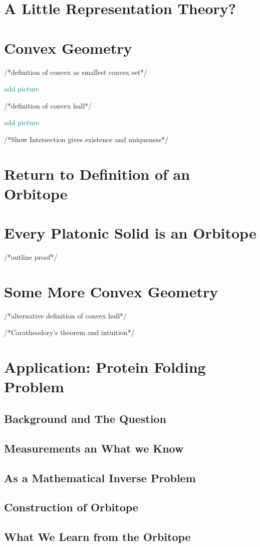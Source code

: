 \documentclass[12]{amsart}
\newcommand{\toadd}[1]{/*#1*/}
\newcommand{\note}[1]{\textcolor{teal}{#1}}
\begin{document}
\section{A Little Representation Theory?}

\section{Convex Geometry}
\toadd{definition of convex as smallest convex set}

\note{add picture}

\toadd{definition of convex hull}

\note{add picture}

\toadd{Show Intersection gives existence and uniqueness}

\section{Return to Definition of an Orbitope}

\section{Every Platonic Solid is an Orbitope}
\toadd{outline proof}

\section{Some More Convex Geometry}
\toadd{alternative definition of convex hull}

\toadd{Caratheodory's theorem and intuition}

\section{Application: Protein Folding Problem}
\subsection{Background and The Question}

\subsection{Measurements an What we Know}

\subsection{As a Mathematical Inverse Problem}

\subsection{Construction of Orbitope}

\subsection{What We Learn from the Orbitope}
\end{document}
